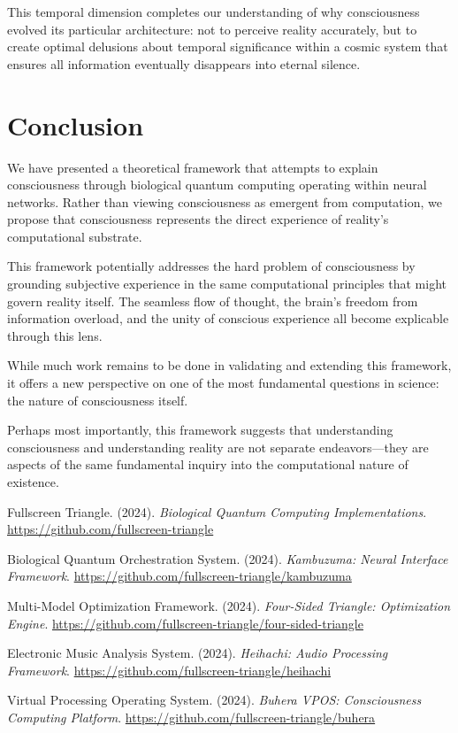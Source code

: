 \documentclass[12pt]{article}
\begin{document}
This temporal dimension completes our understanding of why consciousness evolved its particular architecture: not to perceive reality accurately, but to create optimal delusions about temporal significance within a cosmic system that ensures all information eventually disappears into eternal silence.

\section{Conclusion}

We have presented a theoretical framework that attempts to explain consciousness through biological quantum computing operating within neural networks. Rather than viewing consciousness as emergent from computation, we propose that consciousness represents the direct experience of reality's computational substrate.

This framework potentially addresses the hard problem of consciousness by grounding subjective experience in the same computational principles that might govern reality itself. The seamless flow of thought, the brain's freedom from information overload, and the unity of conscious experience all become explicable through this lens.

While much work remains to be done in validating and extending this framework, it offers a new perspective on one of the most fundamental questions in science: the nature of consciousness itself.

Perhaps most importantly, this framework suggests that understanding consciousness and understanding reality are not separate endeavors—they are aspects of the same fundamental inquiry into the computational nature of existence.

\begin{thebibliography}{99}

Fullscreen Triangle. (2024). \textit{Biological Quantum Computing Implementations}. 
\url{https://github.com/fullscreen-triangle}

Biological Quantum Orchestration System. (2024). \textit{Kambuzuma: Neural Interface Framework}. 
\url{https://github.com/fullscreen-triangle/kambuzuma}

Multi-Model Optimization Framework. (2024). \textit{Four-Sided Triangle: Optimization Engine}. 
\url{https://github.com/fullscreen-triangle/four-sided-triangle}

Electronic Music Analysis System. (2024). \textit{Heihachi: Audio Processing Framework}. 
\url{https://github.com/fullscreen-triangle/heihachi}

Virtual Processing Operating System. (2024). \textit{Buhera VPOS: Consciousness Computing Platform}. 
\url{https://github.com/fullscreen-triangle/buhera}

\end{thebibliography}
\end{document}

